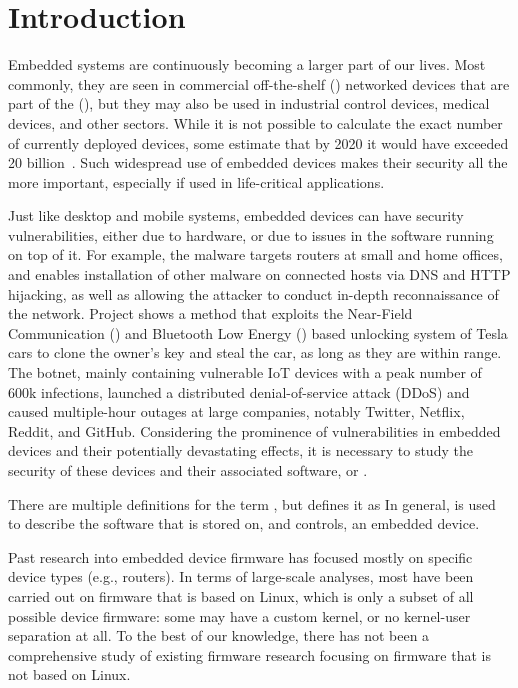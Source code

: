 \section{Introduction}\label{s:intro}
Embedded systems are continuously becoming a larger part of our lives.
Most commonly, they are seen in commercial off-the-shelf () networked devices that are part of the  (), but they may also be used in industrial control devices, medical devices, and other sectors.
While it is not possible to calculate the exact number of currently deployed devices, some estimate that by 2020 it would have exceeded 20 billion~\cite{nordrum2016internet}.
Such widespread use of embedded devices makes their security all the more important, especially if used in life-critical applications.

Just like desktop and mobile systems, embedded devices can have security vulnerabilities, either due to hardware, or due to issues in the software running on top of it.
For example, the  malware targets routers at small and home offices, and enables installation of other malware on connected hosts via DNS and HTTP hijacking, as well as allowing the attacker to conduct in-depth reconnaissance of the network.
Project  shows a method that exploits the Near-Field Communication () and Bluetooth Low Energy () based unlocking system of Tesla cars to clone the owner's key and steal the car, as long as they are within range.
The  botnet, mainly containing vulnerable IoT devices with a peak number of 600k infections, launched a distributed denial-of-service attack (DDoS) and caused multiple-hour outages at large companies, notably Twitter, Netflix, Reddit, and GitHub.
Considering the prominence of vulnerabilities in embedded devices and their potentially devastating effects, it is necessary to study the security of these devices and their associated software, or .

There are multiple definitions for the term , but  defines it as 
In general,  is used to describe the software that is stored on, and controls, an embedded device.

Past research into embedded device firmware has focused mostly on specific device types (e.g., routers).
In terms of large-scale analyses, most have been carried out on firmware that is based on Linux, which is only a subset of all possible device firmware: some may have a custom kernel, or no kernel-user separation at all.
To the best of our knowledge, there has not been a comprehensive study of existing firmware research focusing on firmware that is not based on Linux.

